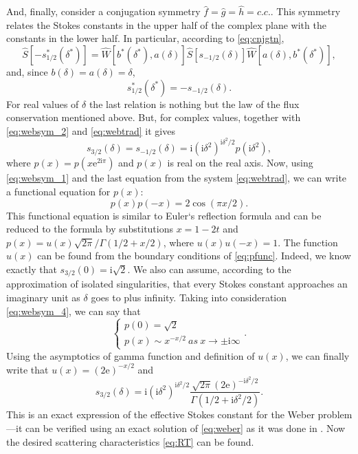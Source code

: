 \documentclass[atmp]{ipart_v1}
\def\rme{\mathrm{e}}
\def\rmi{\mathrm{i}}
\def\f{\hat{f}}
\def\g{\hat{g}}
\def\h{\hat{h}}
\def\S{\widehat{S}}
\def\W{\widehat{W}}
\newcommand\eref[1]{\eqref{#1}}
\begin{document}
And, finally, consider a conjugation symmetry $\f=\g=\h=c.c.$. This symmetry relates the 
Stokes constants in the upper half of the complex plane with the constants in the lower half. 
In particular, according to \eref{eq:cnjgtn},
\begin{equation}
\S \left[ -s_{1/2}^*(\delta^*) \right] = 
\W \left[ b^*(\delta^*),a(\delta) \right]
\S \left[ s_{-1/2}(\delta) \right]
\W \left[ a(\delta),b^*(\delta^*) \right],
\end{equation}
and, since $b(\delta)=a(\delta)=\delta$,
\begin{equation}
s_{1/2}^*(\delta^*)=-s_{-1/2}(\delta).
\label{eq:websym_3}
\end{equation}
For real values of $\delta$ the last relation is nothing but the law of the flux conservation 
mentioned above. But, for complex values, together with \eref{eq:websym_2} and \eref{eq:webtrad} 
it gives
\begin{equation}
s_{3/2}(\delta)=s_{-1/2}(\delta)=\rmi(\rmi \delta^2)^{\rmi \delta^2/2}p(\rmi \delta^2),
\label{eq:websym_4}
\end{equation}
where $p(x)=p(x \rme^{2\rmi\pi})$ and $p(x)$ is real on the real axis. Now, using \eref{eq:websym_1} 
and the last equation from the system \eref{eq:webtrad}, we can write a functional equation for $p(x)$:
\begin{equation}
p(x)p(-x)=2\cos(\pi x/2).
\label{eq:pfunc}
\end{equation}
This functional equation is similar to Euler`s reflection formula \cite{gamma} and can be reduced 
to the formula by substitutions $x=1-2t$ and $p(x)=u(x)\sqrt{2\pi}/\Gamma(1/2+x/2)$, where $u(x)u(-x)=1$. 
The function $u(x)$ can be found from the boundary conditions of \eref{eq:pfunc}. Indeed, we know 
exactly \cite{rwbook} that $s_{3/2}(0)=\rmi\sqrt{2}$. We also can assume, according to the approximation of 
isolated singularities\cite{rwbook,ours}, that every Stokes constant approaches an imaginary 
unit as $\delta$ goes to plus infinity. Taking into consideration \eref{eq:websym_4}, we can say that
\begin{equation}
\begin{cases} 
p(0) = \sqrt{2} \\
p(x) \sim x^{-x/2}\ as\ x \rightarrow \pm \rmi \infty 
\end{cases}.  
\end{equation}
Using the asymptotics of gamma function and definition of $u(x)$, we can finally write 
that $u(x)=(2 \rme)^{-x/2}$ and
\begin{equation}
s_{3/2}(\delta)=\rmi(\rmi\delta^2)^{\rmi\delta^2/2}
\frac{\sqrt{2\pi}(2\rme)^{-\rmi\delta^2/2}}{\Gamma(1/2+\rmi\delta^2/2)}.
\label{eq:s3/2}
\end{equation}
This is an exact expression of the effective Stokes constant for 
the Weber problem---it can be verified using 
an exact solution of \eref{eq:weber} as it was done in \cite{ours}. 
Now the desired scattering characteristics \eref{eq:RT} can be found.
\end{document}
